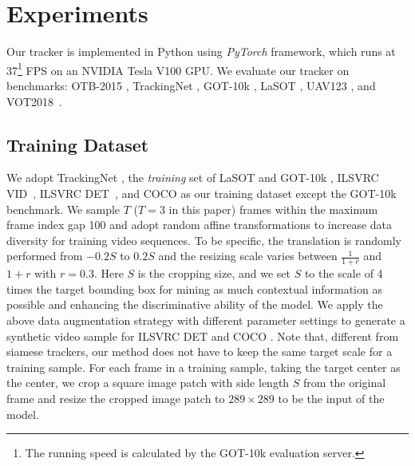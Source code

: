 \documentclass[final]{cvpr}
\begin{document}
\section{Experiments}
Our tracker is implemented in Python using \textit{PyTorch} framework, which runs at 37\footnote{The running speed is calculated by the GOT-10k evaluation server.} FPS on an NVIDIA Tesla V100 GPU.
We evaluate our tracker on benchmarks: OTB-2015 \cite{otb2015}, TrackingNet \cite{muller2018trackingnet}, GOT-10k \cite{huang2019got}, LaSOT \cite{fan2019lasot}, UAV123 \cite{mueller2016benchmark}, and VOT2018~\cite{kristan2018sixth}.

\subsection{Training Dataset}\label{subsec:training-dataset}
We adopt TrackingNet \cite{muller2018trackingnet}, the \textit{training} set of LaSOT \cite{fan2019lasot} and GOT-10k \cite{huang2019got}, ILSVRC VID~\cite{russakovsky2015imagenet}, ILSVRC DET~\cite{russakovsky2015imagenet}, and COCO \cite{lin2014microsoft} as our training dataset except the GOT-10k benchmark.
We sample $T$ ($T=3$ in this paper) frames within the maximum frame index gap 100 and adopt random affine transformations to increase data diversity for training video sequences.
To be specific, the translation is randomly performed from $-0.2S$ to $0.2S$ and the resizing scale varies between $\frac{1}{1+r}$ and $1+r$ with $r=0.3$.
Here $S$ is the cropping size, and we set $S$ to the scale of 4 times the target bounding box for mining as much contextual information as possible and enhancing the discriminative ability of the model.
We apply the above data augmentation strategy with different parameter settings to generate a synthetic video sample for ILSVRC DET \cite{russakovsky2015imagenet} and COCO \cite{lin2014microsoft}.
Note that, different from siamese trackers, our method does not have to keep the same target scale for a training sample.
For each frame in a training sample, taking the target center as the center, we crop a square image patch with side length $S$ from the original frame and resize the cropped image patch to $289 \times 289$ to be the input of the model.

\end{document}
